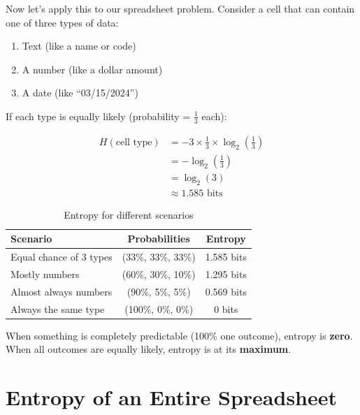 \documentclass[11pt,a4paper]{article}
\begin{document}
Now let's apply this to our spreadsheet problem. Consider a cell that can contain one of three types of data:
\begin{enumerate}
    \item Text (like a name or code)
    \item A number (like a dollar amount)
    \item A date (like ``03/15/2024'')
\end{enumerate}

If each type is equally likely (probability = $\frac{1}{3}$ each):

\begin{align}
H(\text{cell type}) &= -3 \times \frac{1}{3} \times \log_2\left(\frac{1}{3}\right) \\
&= -\log_2\left(\frac{1}{3}\right) \\
&= \log_2(3) \\
&\approx 1.585 \text{ bits}
\end{align}

\begin{table}[h]
\centering
\caption{Entropy for different scenarios}
\begin{tabular}{@{}lcc@{}}
\toprule
\textbf{Scenario} & \textbf{Probabilities} & \textbf{Entropy} \\
\midrule
Equal chance of 3 types & (33\%, 33\%, 33\%) & 1.585 bits \\
Mostly numbers & (60\%, 30\%, 10\%) & 1.295 bits \\
Almost always numbers & (90\%, 5\%, 5\%) & 0.569 bits \\
Always the same type & (100\%, 0\%, 0\%) & 0 bits \\
\bottomrule
\end{tabular}
\label{tab:entropy_examples}
\end{table}

\begin{keyidea}
When something is completely predictable (100\% one outcome), entropy is \textbf{zero}. When all outcomes are equally likely, entropy is at its \textbf{maximum}.
\end{keyidea}

\section{Entropy of an Entire Spreadsheet}
\end{document}
